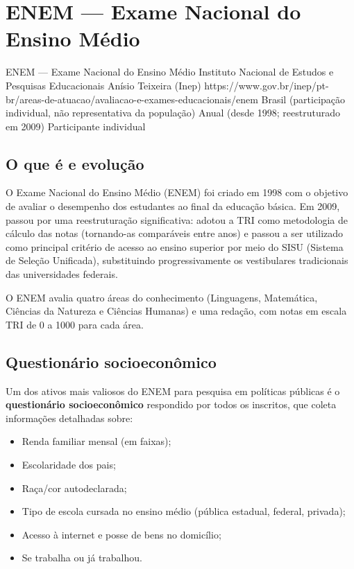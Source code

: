 \section{ENEM — Exame Nacional do Ensino Médio}

\ficharapida
  {ENEM — Exame Nacional do Ensino Médio}
  {Instituto Nacional de Estudos e Pesquisas Educacionais Anísio Teixeira (Inep)}
  {https://www.gov.br/inep/pt-br/areas-de-atuacao/avaliacao-e-exames-educacionais/enem}
  {Brasil (participação individual, não representativa da população)}
  {Anual (desde 1998; reestruturado em 2009)}
  {Participante individual}

\subsection{O que é e evolução}

O Exame Nacional do Ensino Médio (ENEM) foi criado em 1998 com o objetivo de avaliar o desempenho dos estudantes ao final da educação básica. Em 2009, passou por uma reestruturação significativa: adotou a TRI como metodologia de cálculo das notas (tornando-as comparáveis entre anos) e passou a ser utilizado como principal critério de acesso ao ensino superior por meio do SISU (Sistema de Seleção Unificada), substituindo progressivamente os vestibulares tradicionais das universidades federais.

O ENEM avalia quatro áreas do conhecimento (Linguagens, Matemática, Ciências da Natureza e Ciências Humanas) e uma redação, com notas em escala TRI de 0 a 1000 para cada área.

\subsection{Questionário socioeconômico}

Um dos ativos mais valiosos do ENEM para pesquisa em políticas públicas é o \textbf{questionário socioeconômico} respondido por todos os inscritos, que coleta informações detalhadas sobre:

\begin{itemize}
  \item Renda familiar mensal (em faixas);
  \item Escolaridade dos pais;
  \item Raça/cor autodeclarada;
  \item Tipo de escola cursada no ensino médio (pública estadual, federal, privada);
  \item Acesso à internet e posse de bens no domicílio;
  \item Se trabalha ou já trabalhou.
\end{itemize}

